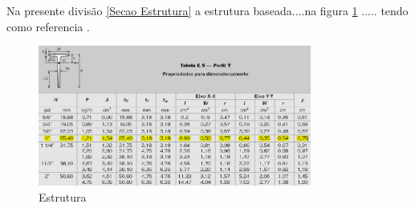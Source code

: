  \label{Secao Estrutura}

Na presente divisão \ref{Secao Estrutura}  a estrutura baseada....na figura \ref{fig:awesome_image} ..... tendo como referencia \cite{shigley2011shigley}.

\begin{figure}[h]
    \centering
    \includegraphics[width=0.8\textwidth]{figuras/perfil_t.png}
    \caption{Estrutura}
    \label{fig:awesome_image}
\end{figure}
